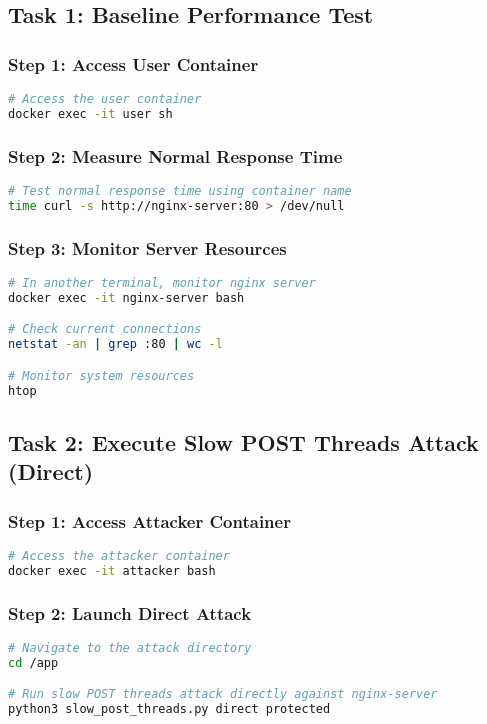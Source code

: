 \documentclass[12pt]{article}
\begin{document}
\subsection{Task 1: Baseline Performance Test}

\subsubsection{Step 1: Access User Container}
\begin{lstlisting}[language=bash]
# Access the user container
docker exec -it user sh
\end{lstlisting}

\subsubsection{Step 2: Measure Normal Response Time}
\begin{lstlisting}[language=bash]
# Test normal response time using container name
time curl -s http://nginx-server:80 > /dev/null
\end{lstlisting}

\subsubsection{Step 3: Monitor Server Resources}
\begin{lstlisting}[language=bash]
# In another terminal, monitor nginx server
docker exec -it nginx-server bash

# Check current connections
netstat -an | grep :80 | wc -l

# Monitor system resources
htop
\end{lstlisting}

\subsection{Task 2: Execute Slow POST Threads Attack (Direct)}

\subsubsection{Step 1: Access Attacker Container}
\begin{lstlisting}[language=bash]
# Access the attacker container
docker exec -it attacker bash
\end{lstlisting}

\subsubsection{Step 2: Launch Direct Attack}
\begin{lstlisting}[language=bash]
# Navigate to the attack directory
cd /app

# Run slow POST threads attack directly against nginx-server
python3 slow_post_threads.py direct protected
\end{lstlisting}
\end{document}
